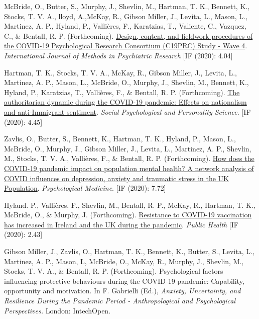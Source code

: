 \documentclass[12pt]{article}
\begin{document}
\begin{bibenum}
	\item McBride, O., Butter, S., Murphy, J., Shevlin, M., Hartman, T. K., Bennett, K.,  Stocks, T. V. A., lloyd, A.,McKay, R.,  Gibson Miller, J.,  Levita, L., Mason, L., Martinez, A. P.,  Hyland, P., Vallières, F., Karatzias, T., Valiente, C., Vazquez, C., \& Bentall, R. P. (Forthcoming). \href{https://psyarxiv.com/nytxc/}{Design, content, and fieldwork procedures of the COVID-19 Psychological Research Consortium (C19PRC) Study - Wave 4}. 
	\emph{International Journal of Methods in Psychiatric Research} [IF (2020): 4.04]

	\item Hartman, T. K.,  Stocks, T. V. A., McKay, R., Gibson Miller, J., Levita, L., 
	Martinez, A. P., Mason, L., McBride, O., Murphy, J., Shevlin, M., Bennett, K., 
	Hyland, P., Karatzias, T., Vallières, F., \& Bentall, R. P. (Forthcoming). 
		\href{https://doi.org/10.1177/1948550620978023}{The authoritarian 
		dynamic during the COVID-19 pandemic: Effects on nationalism and 
		anti-Immigrant sentiment}.
		\emph{Social Psychological and Personality Science}. [IF (2020): 4.45]
	
	\item Zavlis, O., Butter, S., Bennett, K., Hartman, T. K., Hyland, P., 
	Mason, L., McBride, O., Murphy, J., Gibson Miller, J., Levita, L., 
	Martinez, A. P., Shevlin, M., Stocks, T. V. A., Vallières, F., 
	\& Bentall, R. P. (Forthcoming). 
		\href{https://doi.org/10.1017/S0033291721000635}{How does the COVID-19 
		pandemic impact on population mental health? A network analysis of 
		COVID influences on depression, anxiety and traumatic stress in the 
		UK Population}.
		\emph{Psychological Medicine}. [IF (2020): 7.72]
	
	\item Hyland. P., Vallières, F., Shevlin, M.,  Bentall, R. P., McKay, R., 
	Hartman, T. K., McBride, O., \& Murphy, J. (Forthcoming). 
		\href{https://doi.org/10.1016/j.puhe.2021.04.009}{Resistance to 
		COVID-19 vaccination has increased in Ireland and the UK during the pandemic}.
		\emph{Public Health} [IF (2020): 2.43]
	
	\item Gibson Miller, J., Zavlis, O., Hartman, T. K., Bennett, K., Butter, S., 
	Levita, L., Martinez, A. P., Mason, L, McBride, O., McKay, R., Murphy, J., 
	Shevlin, M., Stocks, T. V. A., \& Bentall, R. P. (Forthcoming). 
		Psychological factors influencing protective behaviours during 
		the COVID-19 pandemic: Capability, opportunity and motivation. 
		In F. Gabrielli (Ed.), \textit{Anxiety, Uncertainty, and Resilience 
		During the Pandemic Period - Anthropological and Psychological 
		Perspectives.} London: IntechOpen.
	

\end{bibenum}
\end{document}
